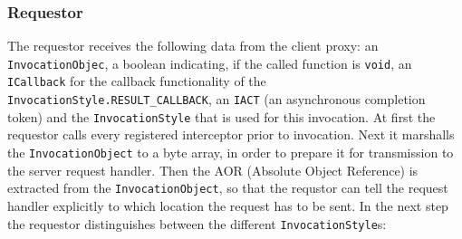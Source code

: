 \subsubsection{Requestor}
The requestor receives the following data from the client proxy: an \texttt{InvocationObjec}, a boolean indicating, if the called function is \texttt{void}, an \texttt{ICallback} for the callback functionality of the \texttt{InvocationStyle.RESULT\_CALLBACK}, an \texttt{IACT} (an asynchronous completion token) and the \texttt{InvocationStyle} that is used for this invocation. At first the requestor calls every registered interceptor prior to invocation. Next it marshalls the \texttt{InvocationObject} to a byte array, in order to prepare it for transmission to the server request handler. Then the AOR (Absolute Object Reference) is extracted from the \texttt{InvocationObject}, so that the requstor can tell the request handler explicitly to which location the request has to be sent. In the next step the requestor distinguishes between the different \texttt{InvocationStyle}s:
